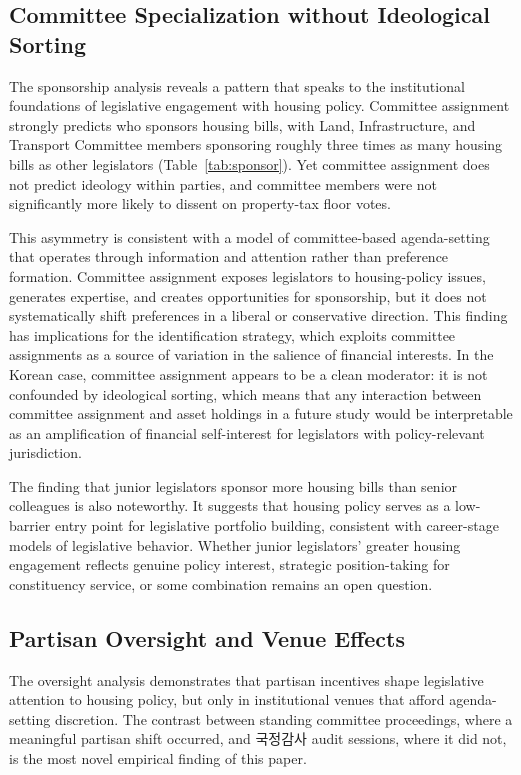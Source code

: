 \documentclass[11pt]{article}
\begin{document}
\subsection{Committee Specialization without Ideological Sorting}

The sponsorship analysis reveals a pattern that speaks to the institutional foundations of legislative engagement with housing policy. Committee assignment strongly predicts who sponsors housing bills, with Land, Infrastructure, and Transport Committee members sponsoring roughly three times as many housing bills as other legislators (Table~\ref{tab:sponsor}). Yet committee assignment does not predict ideology within parties, and committee members were not significantly more likely to dissent on property-tax floor votes.

This asymmetry is consistent with a model of committee-based agenda-setting that operates through information and attention rather than preference formation. Committee assignment exposes legislators to housing-policy issues, generates expertise, and creates opportunities for sponsorship, but it does not systematically shift preferences in a liberal or conservative direction. This finding has implications for the \citet{tahoun2014} identification strategy, which exploits committee assignments as a source of variation in the salience of financial interests. In the Korean case, committee assignment appears to be a clean moderator: it is not confounded by ideological sorting, which means that any interaction between committee assignment and asset holdings in a future study would be interpretable as an amplification of financial self-interest for legislators with policy-relevant jurisdiction.

The finding that junior legislators sponsor more housing bills than senior colleagues is also noteworthy. It suggests that housing policy serves as a low-barrier entry point for legislative portfolio building, consistent with career-stage models of legislative behavior. Whether junior legislators' greater housing engagement reflects genuine policy interest, strategic position-taking for constituency service, or some combination remains an open question.

\subsection{Partisan Oversight and Venue Effects}

The oversight analysis demonstrates that partisan incentives shape legislative attention to housing policy, but only in institutional venues that afford agenda-setting discretion. The contrast between standing committee proceedings, where a meaningful partisan shift occurred, and 국정감사 audit sessions, where it did not, is the most novel empirical finding of this paper.
\end{document}
